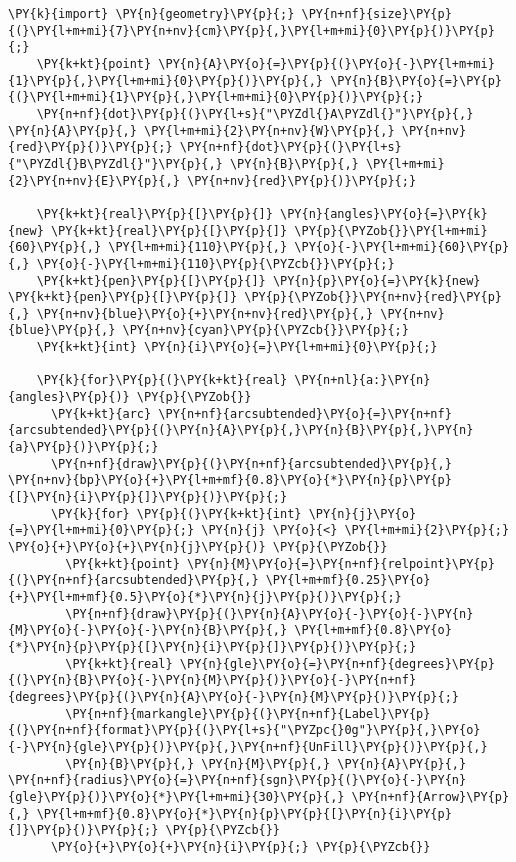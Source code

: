 \begin{Verbatim}[commandchars=\\\{\}]
    \PY{k}{import} \PY{n}{geometry}\PY{p}{;} \PY{n+nf}{size}\PY{p}{(}\PY{l+m+mi}{7}\PY{n+nv}{cm}\PY{p}{,}\PY{l+m+mi}{0}\PY{p}{)}\PY{p}{;}
    \PY{k+kt}{point} \PY{n}{A}\PY{o}{=}\PY{p}{(}\PY{o}{-}\PY{l+m+mi}{1}\PY{p}{,}\PY{l+m+mi}{0}\PY{p}{)}\PY{p}{,} \PY{n}{B}\PY{o}{=}\PY{p}{(}\PY{l+m+mi}{1}\PY{p}{,}\PY{l+m+mi}{0}\PY{p}{)}\PY{p}{;}
    \PY{n+nf}{dot}\PY{p}{(}\PY{l+s}{"\PYZdl{}A\PYZdl{}"}\PY{p}{,} \PY{n}{A}\PY{p}{,} \PY{l+m+mi}{2}\PY{n+nv}{W}\PY{p}{,} \PY{n+nv}{red}\PY{p}{)}\PY{p}{;} \PY{n+nf}{dot}\PY{p}{(}\PY{l+s}{"\PYZdl{}B\PYZdl{}"}\PY{p}{,} \PY{n}{B}\PY{p}{,} \PY{l+m+mi}{2}\PY{n+nv}{E}\PY{p}{,} \PY{n+nv}{red}\PY{p}{)}\PY{p}{;}

    \PY{k+kt}{real}\PY{p}{[}\PY{p}{]} \PY{n}{angles}\PY{o}{=}\PY{k}{new} \PY{k+kt}{real}\PY{p}{[}\PY{p}{]} \PY{p}{\PYZob{}}\PY{l+m+mi}{60}\PY{p}{,} \PY{l+m+mi}{110}\PY{p}{,} \PY{o}{-}\PY{l+m+mi}{60}\PY{p}{,} \PY{o}{-}\PY{l+m+mi}{110}\PY{p}{\PYZcb{}}\PY{p}{;}
    \PY{k+kt}{pen}\PY{p}{[}\PY{p}{]} \PY{n}{p}\PY{o}{=}\PY{k}{new} \PY{k+kt}{pen}\PY{p}{[}\PY{p}{]} \PY{p}{\PYZob{}}\PY{n+nv}{red}\PY{p}{,} \PY{n+nv}{blue}\PY{o}{+}\PY{n+nv}{red}\PY{p}{,} \PY{n+nv}{blue}\PY{p}{,} \PY{n+nv}{cyan}\PY{p}{\PYZcb{}}\PY{p}{;}
    \PY{k+kt}{int} \PY{n}{i}\PY{o}{=}\PY{l+m+mi}{0}\PY{p}{;}

    \PY{k}{for}\PY{p}{(}\PY{k+kt}{real} \PY{n+nl}{a:}\PY{n}{angles}\PY{p}{)} \PY{p}{\PYZob{}}
      \PY{k+kt}{arc} \PY{n+nf}{arcsubtended}\PY{o}{=}\PY{n+nf}{arcsubtended}\PY{p}{(}\PY{n}{A}\PY{p}{,}\PY{n}{B}\PY{p}{,}\PY{n}{a}\PY{p}{)}\PY{p}{;}
      \PY{n+nf}{draw}\PY{p}{(}\PY{n+nf}{arcsubtended}\PY{p}{,} \PY{n+nv}{bp}\PY{o}{+}\PY{l+m+mf}{0.8}\PY{o}{*}\PY{n}{p}\PY{p}{[}\PY{n}{i}\PY{p}{]}\PY{p}{)}\PY{p}{;}
      \PY{k}{for} \PY{p}{(}\PY{k+kt}{int} \PY{n}{j}\PY{o}{=}\PY{l+m+mi}{0}\PY{p}{;} \PY{n}{j} \PY{o}{<} \PY{l+m+mi}{2}\PY{p}{;} \PY{o}{+}\PY{o}{+}\PY{n}{j}\PY{p}{)} \PY{p}{\PYZob{}}
        \PY{k+kt}{point} \PY{n}{M}\PY{o}{=}\PY{n+nf}{relpoint}\PY{p}{(}\PY{n+nf}{arcsubtended}\PY{p}{,} \PY{l+m+mf}{0.25}\PY{o}{+}\PY{l+m+mf}{0.5}\PY{o}{*}\PY{n}{j}\PY{p}{)}\PY{p}{;}
        \PY{n+nf}{draw}\PY{p}{(}\PY{n}{A}\PY{o}{-}\PY{o}{-}\PY{n}{M}\PY{o}{-}\PY{o}{-}\PY{n}{B}\PY{p}{,} \PY{l+m+mf}{0.8}\PY{o}{*}\PY{n}{p}\PY{p}{[}\PY{n}{i}\PY{p}{]}\PY{p}{)}\PY{p}{;}
        \PY{k+kt}{real} \PY{n}{gle}\PY{o}{=}\PY{n+nf}{degrees}\PY{p}{(}\PY{n}{B}\PY{o}{-}\PY{n}{M}\PY{p}{)}\PY{o}{-}\PY{n+nf}{degrees}\PY{p}{(}\PY{n}{A}\PY{o}{-}\PY{n}{M}\PY{p}{)}\PY{p}{;}
        \PY{n+nf}{markangle}\PY{p}{(}\PY{n+nf}{Label}\PY{p}{(}\PY{n+nf}{format}\PY{p}{(}\PY{l+s}{"\PYZpc{}0g"}\PY{p}{,}\PY{o}{-}\PY{n}{gle}\PY{p}{)}\PY{p}{,}\PY{n+nf}{UnFill}\PY{p}{)}\PY{p}{,}
        \PY{n}{B}\PY{p}{,} \PY{n}{M}\PY{p}{,} \PY{n}{A}\PY{p}{,} \PY{n+nf}{radius}\PY{o}{=}\PY{n+nf}{sgn}\PY{p}{(}\PY{o}{-}\PY{n}{gle}\PY{p}{)}\PY{o}{*}\PY{l+m+mi}{30}\PY{p}{,} \PY{n+nf}{Arrow}\PY{p}{,} \PY{l+m+mf}{0.8}\PY{o}{*}\PY{n}{p}\PY{p}{[}\PY{n}{i}\PY{p}{]}\PY{p}{)}\PY{p}{;} \PY{p}{\PYZcb{}}
      \PY{o}{+}\PY{o}{+}\PY{n}{i}\PY{p}{;} \PY{p}{\PYZcb{}}
\end{Verbatim}
